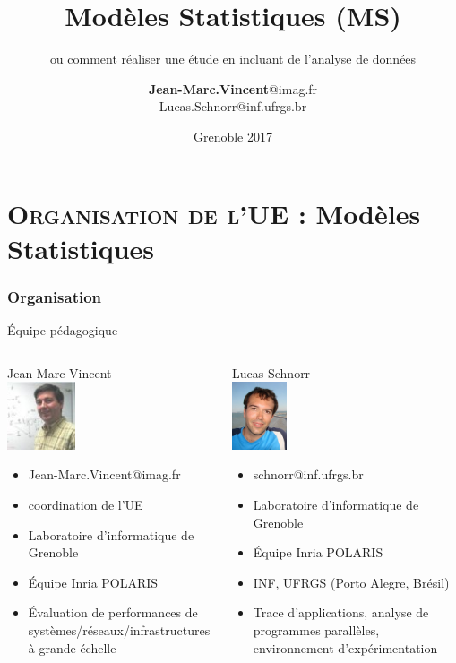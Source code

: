 \documentclass[xcolor=x11names,compress,8pt]{beamer}
\title[] %
{Modèles Statistiques (MS)}
\subtitle{ou comment réaliser une étude en incluant de l'analyse de données}
\author%
{		
  \textbf{Jean-Marc.Vincent}@imag.fr \\
  Lucas.Schnorr@inf.ufrgs.br
}
\institute[Université  Grenoble-Alpes] %
{%
 Laboratoire LIG\\
  Équipe-Projet Inria POLARIS
}
\date[Grenoble 2017] %
{
Grenoble 2017
}
\renewcommand{\(}{\begin{columns}}
\renewcommand{\)}{\end{columns}}
\newcommand{\<}[1]{\begin{column}{#1}}
\renewcommand{\>}{\end{column}}
\begin{document}
\begin{frame}
\titlepage
\end{frame}
\section[{\scshape Organisation}]{{\scshape Organisation de l'UE} : Modèles Statistiques }
\begin{frame}
\frametitle{Organisation}	
\begin{block}{Équipe pédagogique}
\begin{columns}[t]
\begin{center}
Jean-Marc Vincent \\
 \includegraphics[height=2cm]{images/Jean-Marc.jpg}
\begin{itemize}
\item[]  Jean-Marc.Vincent@imag.fr
\item[]  coordination de l'UE
 \item[]  Laboratoire d'informatique de Grenoble 
\item[] Équipe Inria POLARIS
\item[]   Évaluation de performances de systèmes/réseaux/infrastructures à grande échelle
\end{itemize}
\end{center}
\begin{center}
Lucas Schnorr\\
 \includegraphics[height=2cm]{images/lucas-schnorr.png}
\begin{itemize}
\item[]   schnorr@inf.ufrgs.br
\item[] Laboratoire d'informatique de Grenoble  
\item[] Équipe Inria POLARIS
\item[] INF, UFRGS (Porto Alegre, Brésil)
\item[] Trace d'applications, analyse de programmes parallèles, environnement d'expérimentation
\end{itemize}
\end{center}
\end{columns}
\end{block}
\end{frame}
\end{document}
